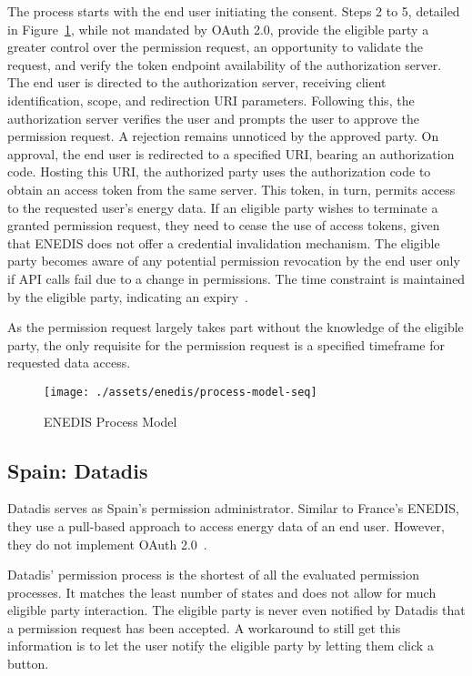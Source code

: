 The process starts with the end user initiating the consent.
Steps 2 to 5, detailed in Figure\ \ref{fig:enedis-process-model}, while not mandated by OAuth 2.0,
provide the eligible party a greater control over the permission request, an opportunity to validate the request,
and verify the token endpoint availability of the authorization server.
The end user is directed to the authorization server,
receiving client identification, scope, and redirection URI parameters.
Following this, the authorization server verifies the user and prompts the user to approve the permission request.
A rejection remains unnoticed by the approved party.
On approval, the end user is redirected to a specified URI, bearing an authorization code.
Hosting this URI, the authorized party uses the authorization code to obtain an access token from the same server.
This token, in turn, permits access to the requested user's energy data.
If an eligible party wishes to terminate a granted permission request,
they need to cease the use of access tokens, given that ENEDIS does not offer a credential invalidation mechanism.
The eligible party becomes aware of any potential permission revocation by the end user
only if API calls fail due to a change in permissions.
The time constraint is maintained by the eligible party, indicating an expiry~\cite{enedis-dev-guide,rfc6749-oauth}.

As the permission request largely takes part without the knowledge of the eligible party,
the only requisite for the permission request is a specified timeframe for requested data access.

\begin{figure}[h]
    \texttt{[image: ./assets/enedis/process-model-seq]}
    \caption{ENEDIS Process Model}
    \label{fig:enedis-process-model}
\end{figure}

\subsection{Spain: Datadis}\label{subsec:spain:-datadis}
Datadis serves as Spain's permission administrator.
Similar to France's ENEDIS, they use a pull-based approach to access energy data of an end user.
However, they do not implement OAuth 2.0~\cite{datadis-dev-guide}.

Datadis' permission process is the shortest of all the evaluated permission processes.
It matches the least number of states and does not allow for much eligible party interaction.
The eligible party is never even notified by Datadis that a permission request has been accepted.
A workaround to still get this information is to let the user notify the eligible party by letting them click a button.

